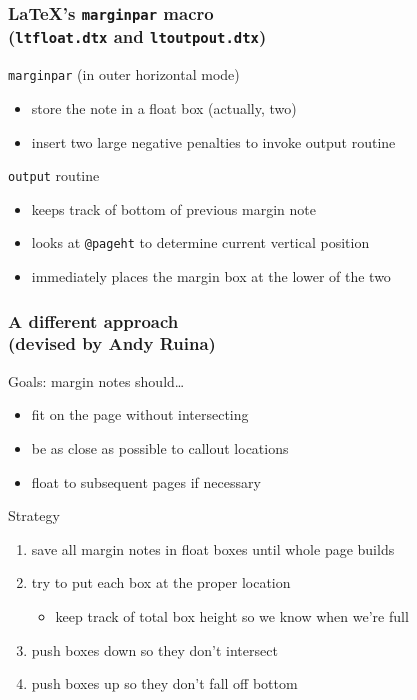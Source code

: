 \documentclass{beamer}
\def\cs#1{\texttt{\expandafter\string\csname#1\endcsname}}
\begin{document}
\begin{frame}
  \frametitle{\LaTeX's \cs{marginpar} macro\\\normalsize
  (\texttt{ltfloat.dtx} and \texttt{ltoutpout.dtx})}
  \begin{block}{\cs{marginpar} (in outer horizontal mode)}
    \begin{itemize}
    \item store the note in a float box (actually, two)
    \item insert two large negative penalties to invoke output routine
    \end{itemize}
  \end{block}
  \begin{block}{\cs{output} routine}
    \begin{itemize}
    \item keeps track of bottom of previous margin note
    \item looks at \cs{@pageht} to determine current vertical position
    \item immediately places the margin box at the lower of the two
    \end{itemize}
  \end{block}
\end{frame}
 
\begin{frame}
  \frametitle{A different approach\\\normalsize(devised by Andy Ruina)}
  \begin{block}{Goals: margin notes should\ldots}
    \begin{itemize}
    \item fit on the page without intersecting
    \item be as close as possible to callout locations
    \item float to subsequent pages if necessary
    \end{itemize}
  \end{block}
  \begin{block}{Strategy}
    \begin{enumerate}
      \addtocounter{enumi}{-1}
    \item save all margin notes in float boxes until whole page builds
    \item try to put each box at the proper location
      \begin{itemize}
      \item keep track of total box height so we know when we're full
      \end{itemize}
    \item push boxes down so they don't intersect
    \item push boxes up so they don't fall off bottom
    \end{enumerate}
  \end{block}
\end{frame}
\end{document}
